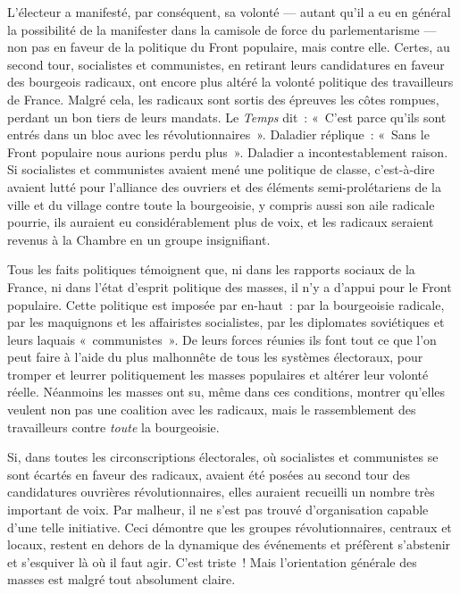 \documentclass[french,twoside]{book} %
\begin{document}
L’électeur a manifesté, par conséquent, sa volonté — autant qu’il a eu en général la possibilité de la manifester dans la camisole de force du parlementarisme — non pas en faveur de la politique du Front populaire, mais contre elle. Certes, au second tour, socialistes et communistes, en retirant leurs candidatures en faveur des bourgeois radicaux, ont encore plus altéré la volonté politique des travailleurs de France. Malgré cela, les radicaux sont sortis des épreuves les côtes rompues, perdant un bon tiers de  leurs mandats. Le \emph{Temps} dit : « C’est parce qu’ils sont entrés dans un bloc avec les révolutionnaires ». Daladier réplique : « Sans le Front populaire nous aurions perdu plus ». Daladier a incontestablement raison. Si socialistes et communistes avaient mené une politique de classe, c’est-à-dire avaient lutté pour l’alliance des ouvriers et des éléments semi-prolétariens de la ville et du village contre toute la bourgeoisie, y compris aussi son aile radicale pourrie, ils auraient eu considérablement plus de voix, et les radicaux seraient revenus à la Chambre en un groupe insignifiant.\par
Tous les faits politiques témoignent que, ni dans les rapports sociaux de la France, ni dans l’état d’esprit politique des masses, il n’y a d’appui pour le Front populaire. Cette politique est imposée par en-haut : par la bourgeoisie radicale, par les maquignons et les affairistes socialistes, par les diplomates soviétiques et leurs laquais « communistes ». De leurs forces réunies ils font tout ce que l’on peut faire à l’aide du plus malhonnête de tous les systèmes électoraux, pour tromper et leurrer politiquement les masses populaires et altérer leur volonté réelle. Néanmoins les masses ont su, même dans ces conditions, montrer qu’elles veulent non pas une coalition avec les radicaux, mais le rassemblement des travailleurs contre \emph{toute} la bourgeoisie.\par
Si, dans toutes les circonscriptions électorales, où socialistes et communistes se sont écartés en faveur des radicaux, avaient été posées au second tour des candidatures ouvrières révolutionnaires, elles auraient recueilli un nombre très important de voix. Par malheur, il ne s’est pas trouvé d’organisation capable d’une telle initiative. Ceci démontre que les groupes révolutionnaires, centraux et locaux, restent en dehors de la dynamique des événements et préfèrent s’abstenir et s’esquiver là où il faut agir. C’est  triste ! Mais l’orientation générale des masses est malgré tout absolument claire.\par
\end{document}
